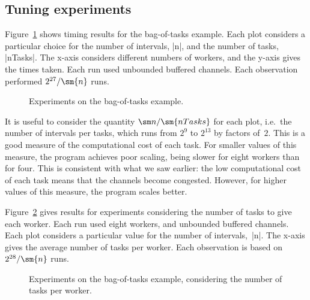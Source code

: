 \subsection{Tuning experiments}

Figure~\ref{fig:bag-of-tasks-experiment} shows timing results for the
bag-of-tasks example.  Each plot considers a particular choice for the number
of intervals, |n|, and the number of tasks, |nTasks|.  The x-axis considers
different numbers of workers, and the y-axis gives the times taken.  Each run
used unbounded buffered channels.  Each observation performed $2^{27}/\sm{n}$
runs.


\begin{figure}
\begin{center}

\end{center}
\caption{Experiments on the bag-of-tasks example.}
\label{fig:bag-of-tasks-experiment}
\end{figure}


It is useful to consider the quantity $\sm n / \sm{nTasks}$ for each plot,
i.e.~the number of intervals per tasks, which runs from $2^9$ to $2^{13}$ by
factors of~$2$.  This is a good measure of the computational cost of each
task.   For smaller values of this measure, the program achieves poor scaling,
being slower for eight workers than for four.  This is consistent with what we
saw earlier: the low computational cost of each task means that the channels
become congested.  However, for higher values of this measure, the program
scales better.  


Figure~\ref{fig:bag-of-tasks-experiment-2} gives results for experiments
considering the number of tasks to give each worker.  Each run used eight
workers, and unbounded buffered channels.  Each plot considers a particular
value for the number of intervals,~|n|.  The x-axis gives the average number
of tasks per worker.  Each observation is based on $2^{28}/\sm{n}$ runs.

\begin{figure}
\begin{center}

\end{center}
\caption{Experiments on the bag-of-tasks example, considering the number of
  tasks per worker.}
\label{fig:bag-of-tasks-experiment-2}
\end{figure}

